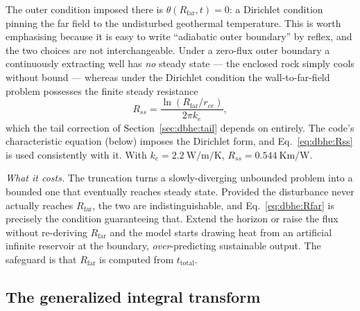 The outer condition imposed there is $\theta(R_{\mathrm{far}},t)=0$: a Dirichlet
condition pinning the far field to the undisturbed geothermal temperature. This
is worth emphasising because it is easy to write ``adiabatic outer boundary''
by reflex, and the two choices are not interchangeable. Under a zero-flux outer
boundary a continuously extracting well has \emph{no} steady state --- the
enclosed rock simply cools without bound --- whereas under the Dirichlet
condition the wall-to-far-field problem possesses the finite steady resistance
\begin{equation}
R_{ss}=\frac{\ln\!\left(R_{\mathrm{far}}/r_{ce}\right)}{2\pi k_e},
\label{eq:dbhe:Rss}
\end{equation}
which the tail correction of Section~\ref{sec:dbhe:tail} depends on entirely.
The code's characteristic equation (below) imposes the Dirichlet form, and
Eq.~\eqref{eq:dbhe:Rss} is used consistently with it. With
$k_e=\SI{2.2}{\watt\per\metre\per\kelvin}$,
$R_{ss}=\SI{0.544}{\kelvin\metre\per\watt}$.

\emph{What it costs.} The truncation turns a slowly-diverging unbounded problem
into a bounded one that eventually reaches steady state. Provided the
disturbance never actually reaches $R_{\mathrm{far}}$, the two are
indistinguishable, and Eq.~\eqref{eq:dbhe:Rfar} is precisely the condition
guaranteeing that. Extend the horizon or raise the flux without re-deriving
$R_{\mathrm{far}}$ and the model starts drawing heat from an artificial infinite
reservoir at the boundary, \emph{over}-predicting sustainable output. The
safeguard is that $R_{\mathrm{far}}$ is computed from $t_{\mathrm{total}}$.

\subsection{The generalized integral transform}
\label{sec:dbhe:gitt}

